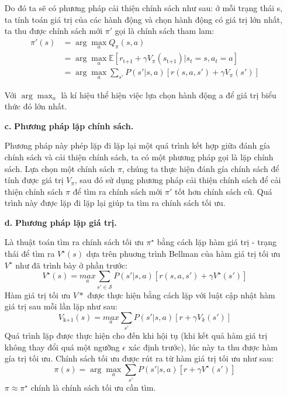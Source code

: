 \documentclass{uetgraduation}
\begin{document}
\begin{itemize}
    Do đó ta sẽ có phương pháp cải thiện chính sách như sau: ở mỗi trạng thái s, ta tính toán giá trị của các hành động và chọn hành động có giá trị lớn nhất, ta thu được chính sách mới
    $\pi'$ gọi là chính sách tham lam:
    \begin{align*}
        \pi' (s) &= \arg \max_{a} Q_\pi (s, a) \\
        &= \arg \max_{a} \mathbb{E} [r_\text{t+1} + \gamma V_\pi (s_\text{t+1}) | s_t = s, a_t = a] \\
        &= \arg \max_{a} \sum_{s'} P(s' | s, a) [r(s, a, s') + \gamma V_\pi(s')]
    \end{align*}

    Với $\arg \max_{a}$ là kí hiệu thể hiện việc lựa chọn hành động a để giá trị biểu thức đó lớn nhất.

    \item[\textbf{c.}] \textbf{Phương pháp lặp chính sách.}
    
    Phương pháp này phép lặp đi lặp lại một quá trình kết hợp giữa đánh gía chính sách và cải thiện chính sách, ta có một phương pháp gọi là lặp chính sách. Lựa chọn một chính sách $\pi$, chúng ta thực hiện đánh gía chính sách để tính được
    giá trị $V_\pi$, sau đó sử dụng phương pháp cải thiện chính sách để cải thiện chính sách $\pi$ để tìm ra chính sách mới $\pi'$ tốt hơn chính sách cũ. Quá trình này được lặp đi lặp lại giúp ta tìm ra chính sách tối ưu.

    \item[\textbf{d.}] \textbf{Phương pháp lặp giá trị.}
    
    Là thuật toán tìm ra chính sách tối ưu $\pi^\star$ bằng cách lặp hàm giá trị - trạng thái để tìm ra $V^\star (s)$ dựa trên phuơng trình Bellman của hàm giá trị tối ưu $V^\star$ như đã trình bày
    ở phần trước:
    \[
    V^\star (s) = \underset{a}{max } \sum_{s' \in \mathcal{S}} P(s' | s, a) [r(s, a, s') + \gamma V^\star (s')]
    \]
    Hàm giá trị tối ưu $V*$ được thực hiện bằng cách lặp với luật cập nhật hàm giá trị sau mỗi lần lặp như sau:
    \[
    V_\text{k+1} (s) = \underset{a}{max } \sum_{s'} P(s' | s, a) [r + \gamma V_k (s')]
    \]
    Quá trình lặp được thực hiện cho đến khi hội tụ (khi kết quả hàm giá trị không thay đổi quá một ngưỡng $\epsilon$ xác định trước), lúc này ta thu được hàm gía trị
    tối ưu. Chính sách tối ưu được rút ra từ hàm giá trị tối ưu như sau:
    \[
    \pi (s) = \arg \max_a \sum_{s'} P(s'|s, a) [r + \gamma V^\star (s')]
    \]
    $\pi \approx \pi^\star$ chính là chính sách tối ưu cần tìm.
    
\end{itemize}
\end{document}
